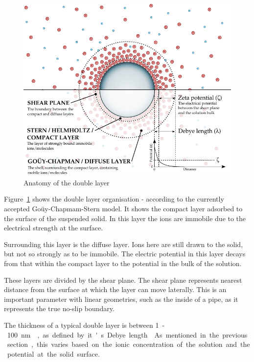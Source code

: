     \begin{figure}
      \begin{center}
        \includegraphics{content/introduction/graphics/doubleLayer_version2}
      \end{center}
      \caption{Anatomy of the double layer}
      \label{fig:doubleLayer_anatomy}
    \end{figure}

    Figure~\ref{fig:doubleLayer_anatomy} shows the double layer organisation - according to the currently accepted Goüy-Chapmam-Stern model.
    It shows the compact layer adsorbed to the surface of the suspended solid.
    In this layer the ions are immobile due to the electrical strength at the surface.
    
    Surrounding this layer is the diffuse layer.
    Ions here are still drawn to the solid, but not so strongly as to be immobile.
    The electric potential in this layer decays from that within the compact layer to the potential in the bulk of the solution.

    These layers are divided by the shear plane.
    The shear plane represents nearest distance from the surface at which the layer can move laterally.
    This is an important parameter with linear geometries, such as the inside of a pipe, as it represents the true no-slip boundary.

    The thickness of a typical double layer is between \SI{1}-\SI{100}{\nano\meter}~\cite{Jiang2010}, as defined by it's Debye length~\cite{Israelachvili2011}.
    As mentioned in the previous section, this varies based on the ionic concentration of the solution and the potential at the solid surface.


